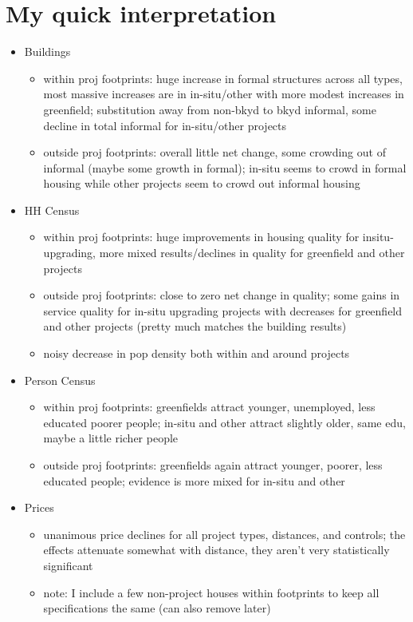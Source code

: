 \documentclass[12pt]{article}
\begin{document}
\section{My quick interpretation}
\begin{itemize}
\item Buildings
\begin{itemize}
    \item within proj footprints: huge increase in formal structures across all types,  most massive increases are in in-situ/other with more modest increases in greenfield; substitution away from non-bkyd to bkyd informal, some decline in total informal for in-situ/other projects
    \item outside proj footprints: overall little net change, some crowding out of informal (maybe some growth in formal); in-situ seems to crowd in formal housing while other projects seem to crowd out informal housing
\end{itemize}
\item HH Census
\begin{itemize}
    \item within proj footprints: huge improvements in housing quality for insitu-upgrading, more mixed results/declines in quality for greenfield and other projects
    \item outside proj footprints: close to zero net change in quality; some gains in service quality for in-situ upgrading projects with decreases for greenfield and other projects (pretty much matches the building results)
    \item noisy decrease in pop density both within and around projects
\end{itemize}
\item Person Census
\begin{itemize}
    \item within proj footprints: greenfields attract younger, unemployed, less educated poorer people; in-situ and other attract slightly older, same edu, maybe a little richer people
    \item outside proj footprints: greenfields again attract younger, poorer, less educated people; evidence is more mixed for in-situ and other
\end{itemize}

\item Prices
\begin{itemize}
    \item unanimous price declines for all project types, distances, and controls; the effects attenuate somewhat with distance, they aren't very statistically significant
    \item note: I include a few non-project houses within footprints to keep all specifications the same (can also remove later)
\end{itemize}


\end{itemize}
\end{document}
